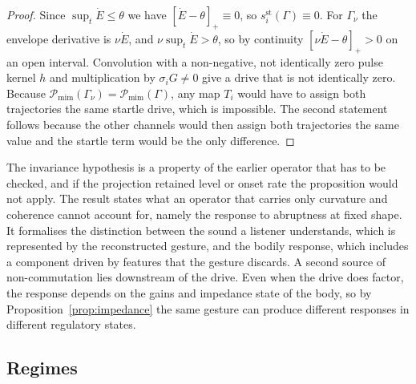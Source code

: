 \documentclass[11pt]{article}
\theoremstyle{plain}
\theoremstyle{definition}
\newcommand{\pos}[1]{\left[#1\right]_{+}}
\begin{document}
\begin{proof}
Since $\sup_t\dot E\le\theta$ we have $\pos{\dot E-\theta}\equiv 0$, so $s_i^{\mathrm{st}}(\Gamma)\equiv 0$. For $\Gamma_\nu$ the envelope derivative is $\nu\dot E$, and $\nu\sup_t\dot E>\theta$, so by continuity $\pos{\nu\dot E-\theta}>0$ on an open interval. Convolution with a non-negative, not identically zero pulse kernel $h$ and multiplication by $\sigma_i G\ne 0$ give a drive that is not identically zero. Because $\mathcal{P}_{\mathrm{mim}}(\Gamma_\nu)=\mathcal{P}_{\mathrm{mim}}(\Gamma)$, any map $T_i$ would have to assign both trajectories the same startle drive, which is impossible. The second statement follows because the other channels would then assign both trajectories the same value and the startle term would be the only difference.
\end{proof}

The invariance hypothesis is a property of the earlier operator that has to be checked, and if the projection retained level or onset rate the proposition would not apply. The result states what an operator that carries only curvature and coherence cannot account for, namely the response to abruptness at fixed shape. It formalises the distinction between the sound a listener understands, which is represented by the reconstructed gesture, and the bodily response, which includes a component driven by features that the gesture discards. A second source of non-commutation lies downstream of the drive. Even when the drive does factor, the response depends on the gains and impedance state of the body, so by Proposition~\ref{prop:impedance} the same gesture can produce different responses in different regulatory states.

\subsection{Regimes}
\end{document}
